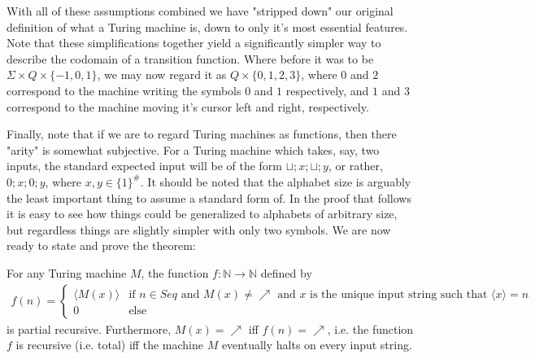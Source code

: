\par With all of these assumptions combined we have "stripped down" our original definition of what a Turing machine is, down to only it's most essential features. Note that these simplifications together yield a significantly simpler way to describe the codomain of a transition function. Where before it was to be $\Sigma \times Q \times \{-1,0,1\}$, we may now regard it as $Q \times \{0,1,2,3\}$, where $0$ and $2$ correspond to the machine writing the symbols $0$ and $1$ respectively, and $1$ and $3$ correspond to the machine moving it's cursor left and right, respectively.
\par Finally, note that if we are to regard Turing machines as functions, then there "arity" is somewhat subjective. For a Turing machine which takes, say, two inputs, the standard expected input will be of the form $\sqcup;x;\sqcup;y$, or rather, $0;x;0;y$, where $x,y \in \{1\}^{\#}$. It should be noted that the alphabet size is arguably the least important thing to assume a standard form of. In the proof that follows it is easy to see how things could be generalized to alphabets of arbitrary size, but regardless things are slightly simpler with only two symbols.
 We are now ready to state and prove the theorem:
\begin{theorem}
    For any Turing machine $M$, the function $f:\mathbb{N} \to \mathbb{N}$ defined by
    \begin{align}
        f(n) = \begin{cases}
                  \langle M(x) \rangle & \textrm{if $n \in Seq$ and $M(x) \neq \nearrow$ and $x$ is the unique input string such that $\langle x \rangle = n$} \\
                  0 & \textrm{else}
               \end{cases}
    \end{align}
    is partial recursive. Furthermore, $M(x) = \nearrow$ iff $f(n) = \nearrow$, i.e. the function $f$ is recursive (i.e. total) iff the machine $M$ eventually halts on every input string.
\end{theorem}
